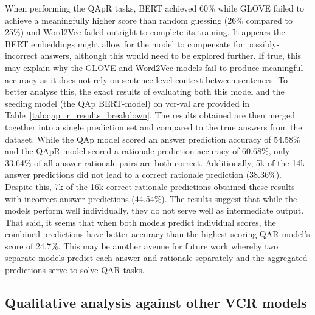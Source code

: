 When performing the QAp\rightarrow{}R tasks, BERT achieved 60\% while GLOVE failed to achieve a meaningfully higher score than random guessing (26\% compared to 25\%) and Word2Vec failed outright to complete its training.
It appears the BERT embeddings might allow for the model to compensate for possibly-incorrect answers, although this would need to be explored further.
If true, this may explain why the GLOVE and Word2Vec models fail to produce meaningful accuracy as it does not rely on sentence-level context between sentences.
To better analyse this, the exact results of evaluating both this model and the seeding model (the Q\rightarrow{}Ap BERT-model) on vcr-val are provided in Table~\ref{tab:qap_r_results_breakdown}.
The results obtained are then merged together into a single prediction set and compared to the true answers from the dataset.
While the Q\rightarrow{}Ap model scored an answer prediction accuracy of 54.58\% and the QAp\rightarrow{}R model scored a rationale prediction accuracy of 60.68\%, only 33.64\% of all answer-rationale pairs are both correct.
Additionally, 5k of the 14k answer predictions did not lead to a correct rationale prediction (38.36\%).
Despite this, 7k of the 16k correct rationale predictions obtained these results with incorrect answer predictions (44.54\%).
The results suggest that while the models perform well individually, they do not serve well as intermediate output.
That said, it seems that when both models predict individual scores, the combined predictions have better accuracy than the highest-scoring Q\rightarrow{}AR model's score of 24.7\%.
This may be another avenue for future work whereby two separate models predict each answer and rationale separately and the aggregated predictions serve to solve Q\rightarrow{}AR tasks.

\subsection{Qualitative analysis against other VCR models}
\label{subsec:qualitative_analysis_against_other_vcr_models}

